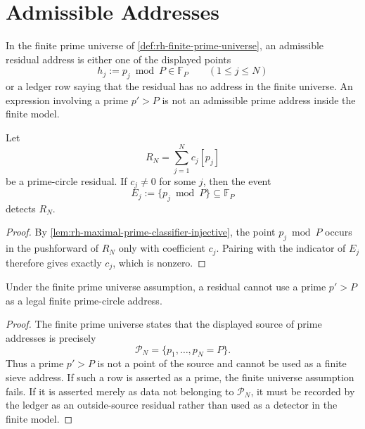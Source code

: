 \section{Admissible Addresses}
\label{sec:rh-finite-prime-circle-universe-admissible-addresses}

\begin{definition}
\label{def:rh-finite-prime-address-policy}
In the finite prime universe of \autoref{def:rh-finite-prime-universe},
an admissible residual address is either one of the displayed points
$$
h_j:=p_j\bmod P\in\mathbb F_P
\qquad
(1\le j\le N)
$$
or a ledger row saying that the residual has no address in the finite
universe.  An expression involving a prime $p'>P$ is not an admissible
prime address inside the finite model.
\end{definition}

\begin{theorem}
\label{thm:rh-existing-prime-addresses-event-detected}
Let
$$
R_N=\sum_{j=1}^{N}c_j[p_j]
$$
be a prime-circle residual.  If $c_j\ne0$ for some $j$, then the event
$$
E_j:=\{p_j\bmod P\}\subseteq\mathbb F_P
$$
detects $R_N$.
\end{theorem}

\begin{proof}
By \autoref{lem:rh-maximal-prime-classifier-injective}, the point
$p_j\bmod P$ occurs in the pushforward of $R_N$ only with coefficient
$c_j$.  Pairing with the indicator of $E_j$ therefore gives exactly
$c_j$, which is nonzero.
\end{proof}

\begin{theorem}
\label{thm:rh-no-external-prime-address-finite-model}
Under the finite prime universe assumption, a residual cannot use a
prime $p'>P$ as a legal finite prime-circle address.
\end{theorem}

\begin{proof}
The finite prime universe states that the displayed source of prime
addresses is precisely
$$
\mathcal P_N=\{p_1,\ldots,p_N=P\}.
$$
Thus a prime $p'>P$ is not a point of the source and cannot be used as
a finite sieve address.  If such a row is asserted as a prime, the
finite universe assumption fails.  If it is asserted merely as data not
belonging to $\mathcal P_N$, it must be recorded by the ledger as an
outside-source residual rather than used as a detector in the finite
model.
\end{proof}

